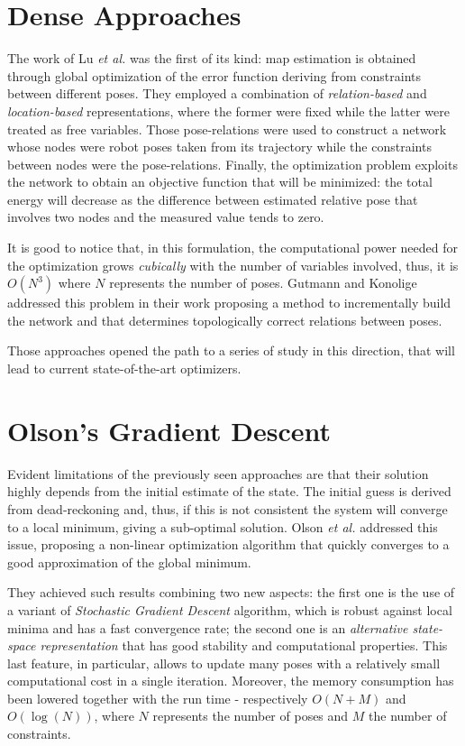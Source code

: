 \section{Dense Approaches}\label{sec:dense_approaches}
The work of Lu \textit{et al.} \cite{lu1997globally} was the first of its kind: map estimation is obtained through global optimization of the error function deriving from constraints between different poses. They employed a combination of \textit{relation-based} and \textit{location-based} representations, where the former were fixed while the latter were treated as free variables. Those pose-relations were used to construct a network whose nodes were robot poses taken from its trajectory while the constraints between nodes were the pose-relations. Finally, the optimization problem exploits the network to obtain an objective function that will be minimized: the total energy will decrease as the difference between estimated relative pose that involves two nodes and the measured value tends to zero. 

It is good to notice that, in this formulation, the computational power needed for the optimization grows \textit{cubically} with the number of variables involved, thus, it is $O(N^3)$ where $N$ represents the number of poses. Gutmann and Konolige addressed this problem in their work \cite{gutmann1999incremental} proposing a method to incrementally build the network and that determines topologically correct relations between poses.

Those approaches opened the path to a series of study in this direction, that will lead to current state-of-the-art optimizers.

\section{Olson's Gradient Descent}\label{sec:olson}
Evident limitations of the previously seen approaches are that their solution highly depends from the initial estimate of the state. The initial guess is derived from dead-reckoning and, thus, if this is not consistent the system will converge to a local minimum, giving a sub-optimal solution. Olson \textit{et al.} \cite{olson2006fast} addressed this issue, proposing a non-linear optimization algorithm that quickly converges to a good approximation of the global minimum. 

They achieved such results combining two new aspects: the first one is the use of a variant of \textit{Stochastic Gradient Descent} algorithm, which is robust against local minima and has a fast convergence rate; the second one is an \textit{alternative state-space representation} that has good stability and computational properties. This last feature, in particular, allows to update many poses with a relatively small computational cost in a single iteration. Moreover, the memory consumption has been lowered together with the run time - respectively $O(N + M)$ and $O(\log(N))$, where $N$ represents the number of poses and $M$ the number of constraints.

